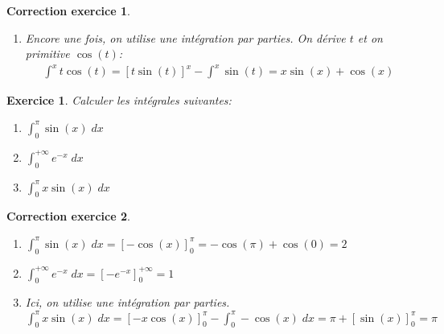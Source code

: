 \documentclass[12pt]{article}
\newtheorem{exercice}{\bf Exercice}
\newtheorem{correction}{\bf Correction exercice}
\newenvironment{exo}{
\begin{exercice}\smallskip\normalfont}{\end{exercice}
}
\newenvironment{cor}{
\begin{correction}\smallskip\normalfont}{\end{correction}
}
\newif\ifcorrige\corrigetrue
\begin{document}
\begin{cor}
\begin{enumerate}
\item Encore une fois, on utilise une int\'egration par parties.
  On d\'erive $t$ et on primitive $\cos(t)$:
  \begin{align*}
    \int^x t \cos(t) = [t\sin(t)]^x - \int^x \sin(t)
    = x \sin(x) + \cos(x)
  \end{align*}
\end{enumerate}
\end{cor}
\color{black}
\fi




\begin{exo} Calculer les int\'egrales suivantes:
\begin{multicols}{3}
\begin{enumerate}
\item $\int_0^{\pi} \sin(x) \;dx$
\item $\int_0^{+\infty} e^{-x} \;dx$
\item $\int_0^{\pi} x \sin(x) \;dx$
\end{enumerate}
\end{multicols}
\end{exo}

\ifcorrige
\color{magenta}
\begin{cor}
$\qquad$
\begin{enumerate}
\item $\int_0^{\pi} \sin(x) \;dx = [-\cos(x)]_0^{\pi} = -\cos(\pi) + \cos(0) = 2$
\item $\int_0^{+\infty} e^{-x} \;dx = [-e^{-x}]_0^{+\infty} = 1$
\item Ici, on utilise une int\'egration par parties.
  $\int_0^{\pi} x \sin(x) \;dx = [-x \cos(x)]_0^{\pi} - \int_0^{\pi} - \cos(x) \;dx
  = \pi + [\sin(x)]_0^{\pi} = \pi$
\end{enumerate}
\end{cor}
\color{black}
\fi

\end{document}
